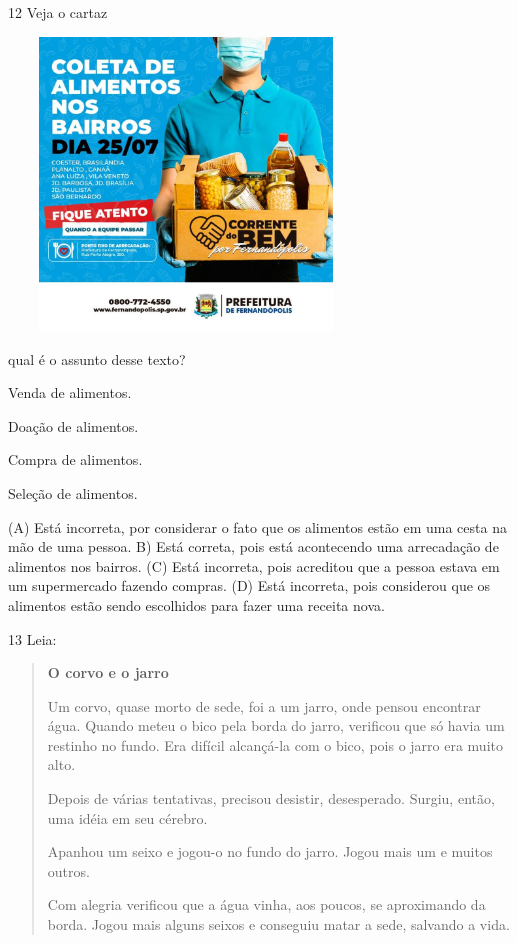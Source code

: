 \num{12} Veja o cartaz

\includegraphics[width=3.71207in,height=3.06667in]{media/image171.jpeg}


qual é o assunto desse texto?

\begin{escolha}
\item Venda de alimentos.

\item Doação de alimentos.

\item Compra de alimentos.

\item Seleção de alimentos.
\end{escolha}


(A) Está incorreta, por considerar o fato que os alimentos estão em uma
cesta na mão de uma pessoa.
B) Está correta, pois está acontecendo uma arrecadação de alimentos nos
bairros.
(C) Está incorreta, pois acreditou que a pessoa estava em um
supermercado fazendo compras.
(D) Está incorreta, pois considerou que os alimentos estão sendo
escolhidos para fazer uma receita nova.

\num{13} Leia:

\begin{quote}
\textbf{O corvo e o jarro}

Um corvo, quase morto de sede, foi a um jarro, onde pensou encontrar
água. Quando meteu o bico pela borda do jarro, verificou que só havia um
restinho no fundo. Era difícil alcançá-la com o bico, pois o jarro era
muito alto.

Depois de várias tentativas, precisou desistir, desesperado. Surgiu,
então, uma idéia em seu cérebro.

Apanhou um seixo e jogou-o no fundo do jarro. Jogou mais
um e muitos outros.

Com alegria verificou que a água vinha, aos poucos, se aproximando da
borda. Jogou mais alguns seixos e conseguiu matar a sede, salvando a
vida.
\end{quote}

